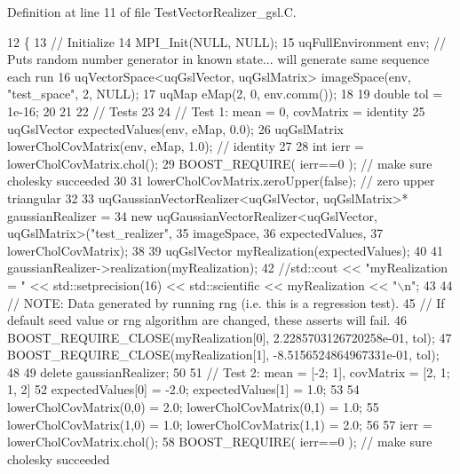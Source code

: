 Definition at line 11 of file Test\-Vector\-Realizer\-\_\-gsl.\-C.


\begin{DoxyCode}
12 \{
13   \textcolor{comment}{// Initialize}
14   MPI\_Init(NULL, NULL);
15   uqFullEnvironment env; \textcolor{comment}{// Puts random number generator in known state... will generate same sequence each
       run}
16   uqVectorSpace<uqGslVector, uqGslMatrix> imageSpace(env, \textcolor{stringliteral}{"test\_space"}, 2, NULL);
17   uqMap eMap(2, 0, env.comm());
18 
19   \textcolor{keywordtype}{double} tol = 1e-16;
20 
21 
22   \textcolor{comment}{// Tests}
23 
24   \textcolor{comment}{// Test 1: mean = 0, covMatrix = identity}
25   uqGslVector expectedValues(env, eMap, 0.0);
26   uqGslMatrix lowerCholCovMatrix(env, eMap, 1.0); \textcolor{comment}{// identity}
27 
28   \textcolor{keywordtype}{int} ierr = lowerCholCovMatrix.chol();
29   BOOST\_REQUIRE( ierr==0 ); \textcolor{comment}{// make sure cholesky succeeded}
30 
31   lowerCholCovMatrix.zeroUpper(\textcolor{keyword}{false}); \textcolor{comment}{// zero upper triangular }
32 
33   uqGaussianVectorRealizer<uqGslVector, uqGslMatrix>* gaussianRealizer = 
34     \textcolor{keyword}{new} uqGaussianVectorRealizer<uqGslVector, uqGslMatrix>(\textcolor{stringliteral}{"test\_realizer"}, 
35                                                                           imageSpace, 
36                                                                           expectedValues, 
37                                                                           lowerCholCovMatrix);
38 
39   uqGslVector myRealization(expectedValues);
40 
41   gaussianRealizer->realization(myRealization);
42   \textcolor{comment}{//std::cout << "myRealization = " << std::setprecision(16) << std::scientific << myRealization << "\(\backslash\)n";}
43 
44   \textcolor{comment}{// NOTE: Data generated by running rng (i.e. this is a regression test).}
45   \textcolor{comment}{// If default seed value or rng algorithm are changed, these asserts will fail.}
46   BOOST\_REQUIRE\_CLOSE(myRealization[0],  2.2285703126720258e-01, tol);
47   BOOST\_REQUIRE\_CLOSE(myRealization[1], -8.5156524864967331e-01, tol);
48 
49   \textcolor{keyword}{delete} gaussianRealizer;
50   
51   \textcolor{comment}{// Test 2: mean = [-2; 1], covMatrix = [2, 1; 1, 2]}
52   expectedValues[0] = -2.0; expectedValues[1] = 1.0;
53   
54   lowerCholCovMatrix(0,0) = 2.0; lowerCholCovMatrix(0,1) = 1.0;
55   lowerCholCovMatrix(1,0) = 1.0; lowerCholCovMatrix(1,1) = 2.0;
56 
57   ierr = lowerCholCovMatrix.chol();
58   BOOST\_REQUIRE( ierr==0 ); \textcolor{comment}{// make sure cholesky succeeded}

\end{DoxyCode}
